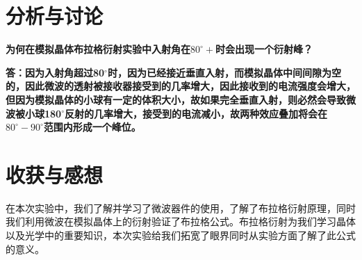 \documentclass[UTF8]{ctexart}
\begin{document}
	\section{分析与讨论}
	\textbf{为何在模拟晶体布拉格衍射实验中入射角在$80^{\circ}+$时会出现一个衍射峰？}
	\par \textbf{答：因为入射角超过80$^{\circ}$时，因为已经接近垂直入射，而模拟晶体中间间隙为空的，因此微波的透射被接收器接受到的几率增大，因此接收到的电流强度会增大，但因为模拟晶体的小球有一定的体积大小，故如果完全垂直入射，则必然会导致微波被小球180$^{\circ}$反射的几率增大，接受到的电流减小，故两种效应叠加将会在$80^{\circ}-90^{\circ}$范围内形成一个峰位。}
	\section{收获与感想}
	在本次实验中，我们了解并学习了微波器件的使用，了解了布拉格衍射原理，同时我们利用微波在模拟晶体上的衍射验证了布拉格公式。布拉格衍射为我们学习晶体以及光学中的重要知识，本次实验给我们拓宽了眼界同时从实验方面了解了此公式的意义。
	
\end{document}
